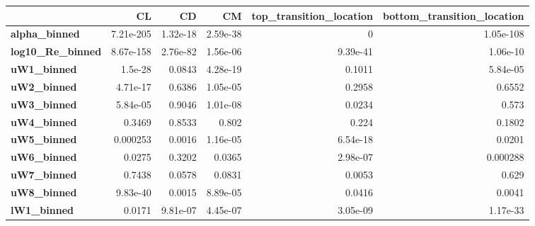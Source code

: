 \documentclass[9pt,a4paper]{article}
\begin{document}
\begin{center}
\footnotesize
\renewcommand{\arraystretch}{1.15}
\begin{tabular}{|l|r|r|r|r|r|}
\hline
\textbf{} & \textbf{CL} & \textbf{CD} & \textbf{CM} & \textbf{top\_transition\_location} & \textbf{bottom\_transition\_location} \\ \hline
\textbf{alpha\_binned} & \cellcolor{failred}7.21e-205 & \cellcolor{failred}1.32e-18 & \cellcolor{failred}2.59e-38 & \cellcolor{failred}0 & \cellcolor{failred}1.05e-108 \\ \hline
\textbf{log10\_Re\_binned} & \cellcolor{failred}8.67e-158 & \cellcolor{failred}2.76e-82 & \cellcolor{failred}1.56e-06 & \cellcolor{failred}9.39e-41 & \cellcolor{failred}1.06e-10 \\ \hline
\textbf{uW1\_binned} & \cellcolor{failred}1.5e-28 & \cellcolor{passgreen}0.0843 & \cellcolor{failred}4.28e-19 & \cellcolor{passgreen}0.1011 & \cellcolor{failred}5.84e-05 \\ \hline
\textbf{uW2\_binned} & \cellcolor{failred}4.71e-17 & \cellcolor{passgreen}0.6386 & \cellcolor{failred}1.05e-05 & \cellcolor{passgreen}0.2958 & \cellcolor{passgreen}0.6552 \\ \hline
\textbf{uW3\_binned} & \cellcolor{failred}5.84e-05 & \cellcolor{passgreen}0.9046 & \cellcolor{failred}1.01e-08 & \cellcolor{failred}0.0234 & \cellcolor{passgreen}0.573 \\ \hline
\textbf{uW4\_binned} & \cellcolor{passgreen}0.3469 & \cellcolor{passgreen}0.8533 & \cellcolor{passgreen}0.802 & \cellcolor{passgreen}0.224 & \cellcolor{passgreen}0.1802 \\ \hline
\textbf{uW5\_binned} & \cellcolor{failred}0.000253 & \cellcolor{failred}0.0016 & \cellcolor{failred}1.16e-05 & \cellcolor{failred}6.54e-18 & \cellcolor{failred}0.0201 \\ \hline
\textbf{uW6\_binned} & \cellcolor{failred}0.0275 & \cellcolor{passgreen}0.3202 & \cellcolor{failred}0.0365 & \cellcolor{failred}2.98e-07 & \cellcolor{failred}0.000288 \\ \hline
\textbf{uW7\_binned} & \cellcolor{passgreen}0.7438 & \cellcolor{passgreen}0.0578 & \cellcolor{passgreen}0.0831 & \cellcolor{failred}0.0053 & \cellcolor{passgreen}0.629 \\ \hline
\textbf{uW8\_binned} & \cellcolor{failred}9.83e-40 & \cellcolor{failred}0.0015 & \cellcolor{failred}8.89e-05 & \cellcolor{failred}0.0416 & \cellcolor{failred}0.0041 \\ \hline
\textbf{lW1\_binned} & \cellcolor{failred}0.0171 & \cellcolor{failred}9.81e-07 & \cellcolor{failred}4.45e-07 & \cellcolor{failred}3.05e-09 & \cellcolor{failred}1.17e-33 \\ \hline

\end{tabular}
\end{center}
\end{document}
